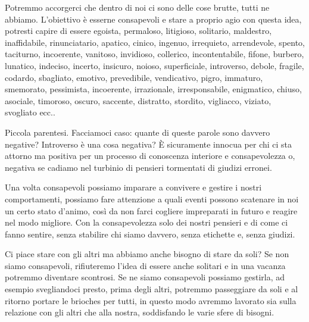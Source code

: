 \documentclass[12pt]{book} %
\begin{document}
\bigskip

Potremmo accorgerci che dentro di noi ci sono delle cose brutte, tutti ne abbiamo. L'obiettivo è
esserne consapevoli e stare a proprio agio con questa idea, potresti capire di essere egoista, permaloso, litigioso,
solitario, maldestro, inaffidabile, rinunciatario, apatico, cinico, ingenuo, irrequieto, arrendevole, spento,
taciturno, incoerente, vanitoso, invidioso, collerico, incontentabile, fifone, burbero, lunatico, indeciso, incerto,
insicuro, noioso, superficiale, introverso, debole, fragile, codardo, sbagliato, emotivo, prevedibile, vendicativo,
pigro, immaturo, smemorato, pessimista, incoerente, irrazionale, irresponsabile, enigmatico, chiuso, asociale,
timoroso, oscuro, saccente, distratto, stordito, vigliacco, viziato, svogliato ecc..

Piccola parentesi. Facciamoci caso: quante di queste parole sono davvero negative? Introverso è una cosa negativa? È
sicuramente innocua per chi ci sta attorno ma positiva per un processo di conoscenza interiore e consapevolezza o,
negativa se cadiamo nel turbinio di pensieri tormentati di giudizi erronei.

Una volta consapevoli possiamo imparare a convivere e gestire i nostri comportamenti, possiamo fare attenzione a quali
eventi possono scatenare in noi un certo stato d'animo, così da non farci cogliere impreparati in
futuro e reagire nel modo migliore. Con la consapevolezza solo dei nostri pensieri e di come ci fanno sentire, senza
stabilire chi siamo davvero, senza etichette e, senza giudizi. 


\bigskip

Ci piace stare con gli altri ma abbiamo anche bisogno di stare da soli? Se non siamo consapevoli, rifiuteremo
l'idea di essere anche solitari e in una vacanza potremmo diventare scontrosi. Se ne siamo
consapevoli possiamo gestirla, ad esempio svegliandoci presto, prima degli altri, potremmo passeggiare da soli e al
ritorno portare le brioches per tutti, in questo modo avremmo lavorato sia sulla relazione con gli altri che alla
nostra, soddisfando le varie sfere di bisogni.


\bigskip
\end{document}
